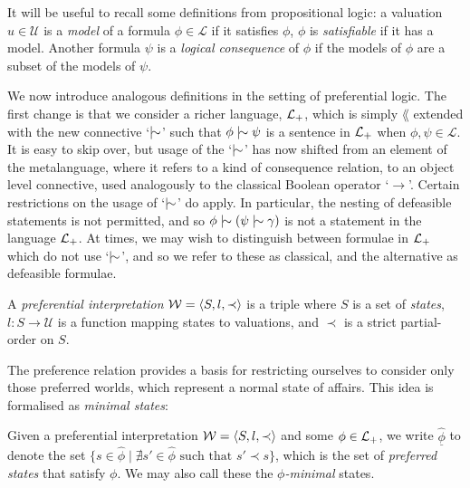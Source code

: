 It will be useful to recall some definitions from propositional logic: a valuation $u \in \mathcal{U}$ is a \textit{model}
of a formula $\phi \in \mathcal{L}$ if it satisfies $\phi$, $\phi$ is \textit{satisfiable} if it has a model. Another formula
$\psi$ is a \textit{logical consequence} of $\phi$ if the models of $\phi$ are a subset of the models of $\psi$.

We now introduce analogous definitions in the setting of preferential logic. The first change is that we consider a richer
language, $\mathcal{L}_+$, which is simply $\lang$ extended with the new connective `$\twiddle$' such that $\phi \twiddle \psi$ is
a sentence in $\mathcal{L}_+$ when $\phi, \psi \in \mathcal{L}$. It is easy to skip over, but usage of the `$\twiddle$' has now shifted
from an element of the metalanguage, where it refers to a kind of consequence relation, to an object level connective,
used analogously to the classical Boolean operator `$\rightarrow$'. Certain restrictions on the usage of `$\twiddle$' do
apply. In particular, the nesting of defeasible statements is not permitted, and so
$\phi \twiddle (\psi \twiddle \gamma )$ is not a statement in the language $\mathcal{L}_+$. At times, we may wish to distinguish
between formulae in $\mathcal{L}_+$ which do not use `$\twiddle$', and so we refer to these as classical, and the alternative as
defeasible formulae.

\begin{definition}
	\label{definition:preferential-interpretation} 

	A \emph{preferential interpretation} $\mathcal{W} = \langle S,l,\prec \rangle$ is a triple where $S$ is a set of \emph{states}, $l: S \to \mathcal{U}$ is
	a function mapping states to valuations, and $\prec$ is a strict partial-order on $S$.
\end{definition}

The preference relation provides a basis for restricting ourselves to consider only those preferred worlds, which
represent a normal state of affairs. This idea is formalised as \textit{minimal states}:

\begin{definition}
	\label{definition:state-minimal}

	Given a preferential interpretation $\mathcal{W} = \langle S,l,\prec \rangle$ and some $\phi \in \mathcal{L}_+$, we write $\underline{\hat{\phi}}$ to denote the set
	$\{s \in \hat{\phi}\mid \nexists s' \in \hat{\phi}\text{ such that }s' \prec s \}$, which is the set of \textit{preferred
	states} that satisfy $\phi$. We may also call these the \textit{$\phi$-minimal} states.
\end{definition}

